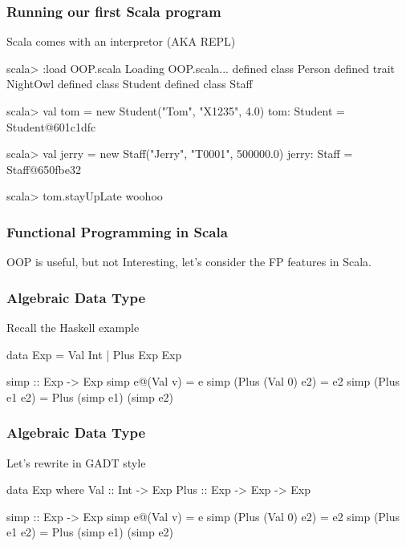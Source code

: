 \documentclass{beamer}
\newcommand{\beb}{\begin{exampleblock}}
\newcommand{\eeb}{\end{exampleblock}}
\begin{document}


\begin{frame}[fragile]
\frametitle{Running our first Scala program}
Scala comes with an interpretor (AKA REPL)

\begin{code}
scala> :load OOP.scala
Loading OOP.scala...
defined class Person
defined trait NightOwl
defined class Student
defined class Staff

scala> val tom = new Student("Tom", "X1235", 4.0)
tom: Student = Student@601c1dfc

scala> val jerry = new Staff("Jerry", "T0001", 500000.0)
jerry: Staff = Staff@650fbe32

scala> tom.stayUpLate
woohoo
\end{code}
\end{frame}
\begin{frame}[fragile]
\frametitle{Functional Programming in Scala}

OOP is useful, but not Interesting, let's consider the FP features in Scala.


\end{frame}
\begin{frame}[fragile]
\frametitle{Algebraic Data Type}
Recall the Haskell example
\beb{}
\begin{code}
data Exp =  Val Int |  Plus Exp Exp 

simp :: Exp -> Exp 
simp e@(Val v) = e
simp (Plus (Val 0) e2) = e2
simp (Plus e1 e2) = Plus (simp e1) (simp e2)
\end{code}
\eeb
\end{frame}
\begin{frame}[fragile]
\frametitle{Algebraic Data Type}
Let's rewrite in GADT style
\beb{}
\begin{code}
data Exp where
    Val  :: Int -> Exp
    Plus :: Exp -> Exp -> Exp

simp :: Exp -> Exp 
simp e@(Val v) = e
simp (Plus (Val 0) e2) = e2
simp (Plus e1 e2) = Plus (simp e1) (simp e2)
\end{code}
\eeb
\end{frame}
\end{document}
